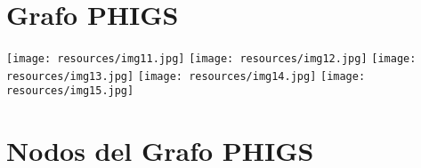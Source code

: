 \documentclass[10pt, a4paper]{article}
\begin{document}
\newpage

\section{Grafo PHIGS}

\begin{center}
	\texttt{[image: resources/img11.jpg]}
	\newpage
	\texttt{[image: resources/img12.jpg]}
	\newpage
	\texttt{[image: resources/img13.jpg]}
	\newpage
	\texttt{[image: resources/img14.jpg]}
	\newpage
	\texttt{[image: resources/img15.jpg]}
\end{center}

\newpage

\section{Nodos del Grafo PHIGS}
\end{document}

